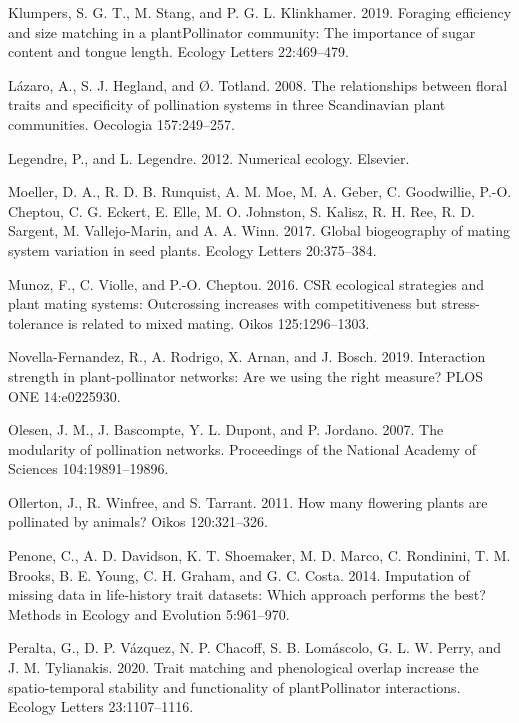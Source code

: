 \documentclass[11pt,a4paper,]{article}
\begin{document}
\hypertarget{ref-klumpers2019}{}
Klumpers, S. G. T., M. Stang, and P. G. L. Klinkhamer. 2019. Foraging
efficiency and size matching in a plantPollinator community: The
importance of sugar content and tongue length. Ecology Letters
22:469--479.

\hypertarget{ref-lazaro2008}{}
Lázaro, A., S. J. Hegland, and Ø. Totland. 2008. The relationships
between floral traits and specificity of pollination systems in three
Scandinavian plant communities. Oecologia 157:249--257.

\hypertarget{ref-legendre2012}{}
Legendre, P., and L. Legendre. 2012. Numerical ecology. Elsevier.

\hypertarget{ref-moeller2017}{}
Moeller, D. A., R. D. B. Runquist, A. M. Moe, M. A. Geber, C.
Goodwillie, P.-O. Cheptou, C. G. Eckert, E. Elle, M. O. Johnston, S.
Kalisz, R. H. Ree, R. D. Sargent, M. Vallejo-Marin, and A. A. Winn.
2017. Global biogeography of mating system variation in seed plants.
Ecology Letters 20:375--384.

\hypertarget{ref-munoz2016}{}
Munoz, F., C. Violle, and P.-O. Cheptou. 2016. CSR ecological strategies
and plant mating systems: Outcrossing increases with competitiveness but
stress-tolerance is related to mixed mating. Oikos 125:1296--1303.

\hypertarget{ref-novella-fernandez2019}{}
Novella-Fernandez, R., A. Rodrigo, X. Arnan, and J. Bosch. 2019.
Interaction strength in plant-pollinator networks: Are we using the
right measure? PLOS ONE 14:e0225930.

\hypertarget{ref-olesen2007}{}
Olesen, J. M., J. Bascompte, Y. L. Dupont, and P. Jordano. 2007. The
modularity of pollination networks. Proceedings of the National Academy
of Sciences 104:19891--19896.

\hypertarget{ref-ollerton2011}{}
Ollerton, J., R. Winfree, and S. Tarrant. 2011. How many flowering
plants are pollinated by animals? Oikos 120:321--326.

\hypertarget{ref-penone2014}{}
Penone, C., A. D. Davidson, K. T. Shoemaker, M. D. Marco, C. Rondinini,
T. M. Brooks, B. E. Young, C. H. Graham, and G. C. Costa. 2014.
Imputation of missing data in life-history trait datasets: Which
approach performs the best? Methods in Ecology and Evolution 5:961--970.

\hypertarget{ref-peralta2020}{}
Peralta, G., D. P. Vázquez, N. P. Chacoff, S. B. Lomáscolo, G. L. W.
Perry, and J. M. Tylianakis. 2020. Trait matching and phenological
overlap increase the spatio-temporal stability and functionality of
plantPollinator interactions. Ecology Letters 23:1107--1116.
\end{document}

